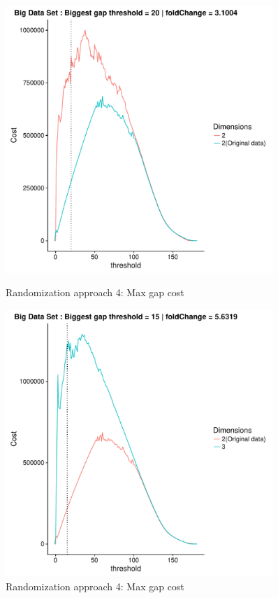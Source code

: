 \documentclass[a4paper,10pt]{article}
\theoremstyle{plain}
\theoremstyle{definition}
\begin{document}
\begin{figure}[H]
	\centering
	\begin{minipage}{0.75\textwidth}
		\centering
		\includegraphics[width=0.9\textwidth]{./plots/plotsCostAndSimAp234/plotBigDataCostAndSim-AP4-S21-K2.pdf}
		\caption{Randomization approach 4: Max gap cost}
		\label{fig:maxGapCostBigDataAp4K2}
	\end{minipage}
	\begin{minipage}{0.75\textwidth}
		\centering
		\includegraphics[width=0.9\textwidth]{./plots/plotsCostAndSimAp234/plotBigDataCostAndSim-AP4-S7-K3.pdf}
		\caption{Randomization approach 4: Max gap cost}
		\label{fig:maxGapCostBigDataAp4K3}
	\end{minipage}
\end{figure}
\end{document}
